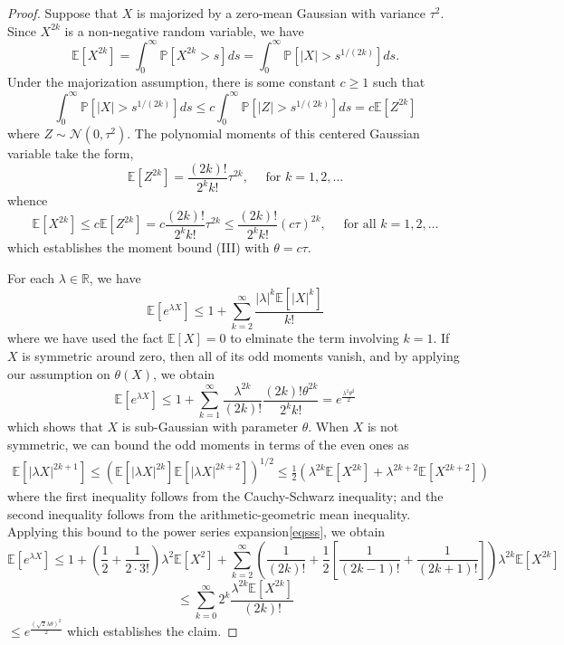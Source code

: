 \documentclass{article}
\begin{document}
\begin{proof}
 Suppose that $X$ is majorized by a zero-mean Gaussian with
variance $\tau^{2}$. Since $X^{2 k}$ is a non-negative random variable, we have
$$
\mathbb{E}\left[X^{2 k}\right]=\int_{0}^{\infty} \mathbb{P}\left[X^{2 k}>s\right] d s=\int_{0}^{\infty} \mathbb{P}\left[|X|>s^{1 /(2 k)}\right] d s .
$$
Under the majorization assumption, there is some constant $c \geq 1$ such that
$$
\int_{0}^{\infty} \mathbb{P}\left[|X|>s^{1 /(2 k)}\right] d s \leq c \int_{0}^{\infty} \mathbb{P}\left[|Z|>s^{1 /(2 k)}\right] d s=c \mathbb{E}\left[Z^{2 k}\right]
$$
where $Z \sim \mathcal{N}\left(0, \tau^{2}\right)$. The polynomial moments of this centered Gaussian variable take the form,
$$
\mathbb{E}\left[Z^{2 k}\right]=\frac{(2 k) !}{2^{k} k !} \tau^{2 k}, \quad \text { for } k=1,2, \ldots
$$
whence
$$
\mathbb{E}\left[X^{2 k}\right] \leq c \mathbb{E}\left[Z^{2 k}\right]=c \frac{(2 k) !}{2^{k} k !} \tau^{2 k} \leq \frac{(2 k) !}{2^{k} k !}(c \tau)^{2 k}, \quad \text { for all } k=1,2, \ldots
$$
which establishes the moment bound (III) with $\theta=c \tau$.

 For each $\lambda \in \mathbb{R}$, we have
$$
\mathbb{E}\left[e^{\lambda X}\right] \leq 1+\sum_{k=2}^{\infty} \frac{|\lambda|^{k} \mathbb{E}\left[|X|^{k}\right]}{k !}
$$
where we have used the fact $\mathbb{E}[X]=0$ to elminate the term involving $k=1$. If $X$ is symmetric around zero, then all of its odd moments vanish, and by applying our assumption on $\theta(X)$, we obtain
$$
\mathbb{E}\left[e^{\lambda X}\right] \leq 1+\sum_{k=1}^{\infty} \frac{\lambda^{2 k}}{(2 k) !} \frac{(2 k) ! \theta^{2 k}}{2^{k} k !}=e^{\frac{\lambda^{2} \theta^{2}}{2}}
$$
which shows that $X$ is sub-Gaussian with parameter $\theta$. When $X$ is not symmetric, we can bound the odd moments in terms of the even
ones as
\begin{align}
    \mathbb{E}\left[|\lambda X|^{2 k+1}\right] \leq\left(\mathbb{E}\left[|\lambda X|^{2 k}\right] \mathbb{E}\left[|\lambda X|^{2 k+2}\right]\right)^{1 / 2} \leq \frac{1}{2}\left(\lambda^{2 k} \mathbb{E}\left[X^{2 k}\right]+\lambda^{2 k+2} \mathbb{E}\left[X^{2 k+2}\right]\right)\label{eqsss}
\end{align}
where the first inequality follows from the Cauchy-Schwarz inequality; and the second inequality follows from the arithmetic-geometric mean inequality. Applying this bound to the power series expansion\cref{eqsss}, we obtain
$$\mathbb{E}\left[e^{\lambda X}\right] \leq 1+\left(\frac{1}{2}+\frac{1}{2 \cdot 3 !}\right) \lambda^{2} \mathbb{E}\left[X^{2}\right]+\sum_{k=2}^{\infty}\left(\frac{1}{(2 k) !}+\frac{1}{2}\left[\frac{1}{(2 k-1) !}+\frac{1}{(2 k+1) !}\right]\right) \lambda^{2 k} \mathbb{E}\left[X^{2 k}\right]$$
$$
\leq \sum_{k=0}^{\infty} 2^{k} \frac{\lambda^{2 k} \mathbb{E}\left[X^{2 k}\right]}{(2 k) !}
$$
$\leq e^{\frac{(\sqrt{2} \lambda \theta)^{2}}{2}}$
which establishes the claim.


\end{proof}
\end{document}

